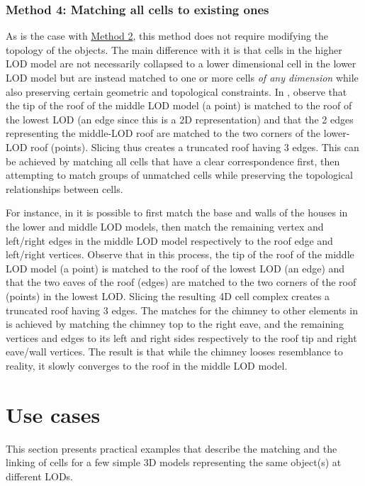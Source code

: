 \subsubsection{Method 4: Matching all cells to existing ones}
\label{sss:method4}

As is the case with \hyperref[sss:method2]{Method 2}, this method does not require modifying the topology of the objects.
The main difference with it is that cells in the higher LOD model are not necessarily collapsed to a lower dimensional cell in the lower LOD model but are instead matched to one or more cells \emph{of any dimension} while also preserving certain geometric and topological constraints.
In , observe that the tip of the roof of the middle LOD model (a point) is matched to the roof of the lowest LOD (an edge since this is a 2D representation) and that the 2 edges representing the middle-LOD roof are matched to the two corners of the lower-LOD roof (points).
Slicing thus creates a truncated roof having 3 edges.
This can be achieved by matching all cells that have a clear correspondence first, then attempting to match groups of unmatched cells while preserving the topological relationships between cells.

For instance, in  it is possible to first match the base and walls of the houses in the lower and middle LOD models, then match the remaining vertex and left/right edges in the middle LOD model respectively to the roof edge and left/right vertices.
Observe that in this process, the tip of the roof of the middle LOD model (a point) is matched to the roof of the lowest LOD (an edge) and that the two eaves of the roof (edges) are matched to the two corners of the roof (points) in the lowest LOD\@.
Slicing the resulting 4D cell complex creates a truncated roof having 3 edges.
The matches for the chimney to other elements in  is achieved by matching the chimney top to the right eave, and the remaining vertices and edges to its left and right sides respectively to the roof tip and right eave/wall vertices.
The result is that while the chimney looses resemblance to reality, it slowly converges to the roof in the middle LOD model.

\section{Use cases}
\label{se:linking-examples}

This section presents practical examples that describe the matching and the linking of cells for a few simple 3D models representing the same object(s) at different LODs.

